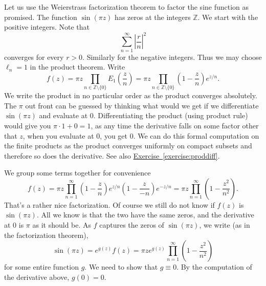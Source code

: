 \documentclass[12pt,openany]{book}
\newcommand{\abs}[1]{\left\lvert {#1} \right\rvert}
\newcommand{\Z}{{\mathbb{Z}}}
\theoremstyle{plain}
\theoremstyle{remark}
\theoremstyle{definition}
\theoremstyle{exercise}
\theoremstyle{example}
\newcommand{\exerciseref}[1]{\hyperref[#1]{Exercise~\ref*{#1}}}
\begin{document}
Let us use the Weierstrass factorization theorem to factor the sine function
as promised.  The function $\sin(\pi z)$ has zeros at the integers $\Z$.
We start with the positive integers.  Note that
\begin{equation*}
\sum_{n=1}^\infty \abs{\frac{r}{n}}^{2}
\end{equation*}
converges for every $r > 0$.  Similarly for the negative integers.  Thus we
may choose $\ell_n =1$ in the product theorem.  Write
\begin{equation*}
f(z) =
\pi z \prod_{n \in \Z \setminus \{ 0 \}} E_1\left(\frac{z}{n}\right)
= 
\pi z \prod_{n \in \Z \setminus \{ 0 \}} \left(1-\frac{z}{n}\right) e^{z/n} .
\end{equation*}
We write the product in no particular order as the product converges
absolutely.
The $\pi$ out front can be guessed by thinking what would we get if we
differentiate $\sin(\pi z)$ and evaluate at $0$.
Differentiating the product (using product rule) would give you $\pi \cdot 1
+ 0=1$, as any time the derivative falls on some factor other that $z$, when
you evaluate at 0, you get 0.  We can do this formal computation on the
finite products as the product converges uniformly on compact subsets and
therefore so does the derivative.  See also \exerciseref{exercise:proddiff}.

We group some terms together for convenience
\begin{equation*}
f(z) =
\pi z \prod_{n=1}^\infty 
\left(1-\frac{z}{n}\right) e^{z/n}
\left(1-\frac{z}{-n}\right) e^{-z/n}
=
\pi z \prod_{n=1}^\infty 
\left(1-\frac{z^2}{n^2}\right) .
\end{equation*}
That's a rather nice factorization.  Of course we still do not know if $f(z)$ is
$\sin(\pi z)$.
All we know is that the two have the same zeros,
and the derivative at 0 is $\pi$ as it should be.
As $f$ captures the zeros of $\sin(\pi z)$, we write
(as in the factorization theorem),
\begin{equation*}
\sin(\pi z)
= 
e^{g(z)} f(z)
=
\pi z
e^{g(z)}
\prod_{n=1}^\infty 
\left(1-\frac{z^2}{n^2}\right)
\end{equation*}
for some entire function $g$.  We need to show that $g \equiv 0$.  By the
computation of the derivative above, $g(0) = 0$.
\end{document}
